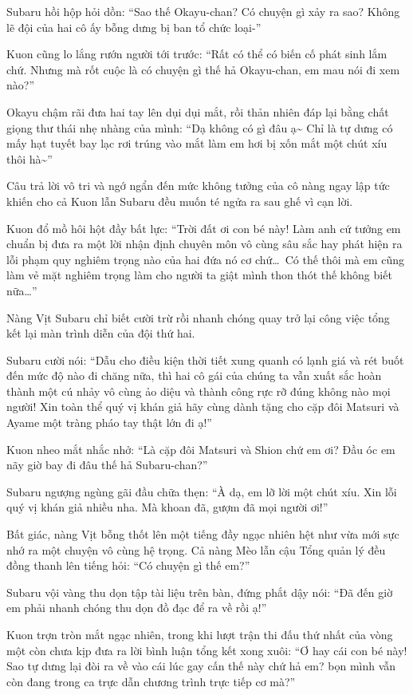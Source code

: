 \documentclass[../main.tex]{subfiles}
\begin{document}
Subaru hồi hộp hỏi dồn: ``Sao thế Okayu-chan? Có chuyện gì xảy ra sao? Không lẽ đội của hai cô ấy bỗng dưng bị ban tổ chức loại-''

Kuon cũng lo lắng rướn người tới trước: ``Rất có thể có biến cố phát sinh lắm chứ. Nhưng mà rốt cuộc là có chuyện gì thế hả Okayu-chan, em mau nói đi xem nào?''

Okayu chậm rãi đưa hai tay lên dụi dụi mắt, rồi thản nhiên đáp lại bằng chất giọng thư thái nhẹ nhàng của mình: ``Dạ không có gì đâu ạ\~{} Chỉ là tự dưng có mấy hạt tuyết bay lạc rơi trúng vào mắt làm em hơi bị xốn mắt một chút xíu thôi hà\~{}''

Câu trả lời vô tri và ngớ ngẩn đến mức không tưởng của cô nàng ngay lập tức khiến cho cả Kuon lẫn Subaru đều muốn té ngửa ra sau ghế vì cạn lời.

Kuon đổ mồ hôi hột đầy bất lực: ``Trời đất ơi con bé này! Làm anh cứ tưởng em chuẩn bị đưa ra một lời nhận định chuyên môn vô cùng sâu sắc hay phát hiện ra lỗi phạm quy nghiêm trọng nào của hai đứa nó cơ chứ\dots\ Có thế thôi mà em cũng làm vẻ mặt nghiêm trọng làm cho người ta giật mình thon thót thế không biết nữa\dots''

Nàng Vịt Subaru chỉ biết cười trừ rồi nhanh chóng quay trở lại công việc tổng kết lại màn trình diễn của đội thứ hai.

Subaru cười nói: ``Dẫu cho điều kiện thời tiết xung quanh có lạnh giá và rét buốt đến mức độ nào đi chăng nữa, thì hai cô gái của chúng ta vẫn xuất sắc hoàn thành một cú nhảy vô cùng ảo diệu và thành công rực rỡ đúng không nào mọi người! Xin toàn thể quý vị khán giả hãy cùng dành tặng cho cặp đôi Matsuri và Ayame một tràng pháo tay thật lớn đi ạ!''

Kuon nheo mắt nhắc nhở: ``Là cặp đôi Matsuri và Shion chứ em ơi? Đầu óc em nãy giờ bay đi đâu thế hả Subaru-chan?''

Subaru ngượng ngùng gãi đầu chữa thẹn: ``À dạ, em lỡ lời một chút xíu. Xin lỗi quý vị khán giả nhiều nha. Mà khoan đã, gượm đã mọi người ơi!''

Bất giác, nàng Vịt bỗng thốt lên một tiếng đầy ngạc nhiên hệt như vừa mới sực nhớ ra một chuyện vô cùng hệ trọng. Cả nàng Mèo lẫn cậu Tổng quản lý đều đồng thanh lên tiếng hỏi: ``Có chuyện gì thế em?''

Subaru vội vàng thu dọn tập tài liệu trên bàn, đứng phắt dậy nói: ``Đã đến giờ em phải nhanh chóng thu dọn đồ đạc để ra về rồi ạ!''

Kuon trợn tròn mắt ngạc nhiên, trong khi lượt trận thi đấu thứ nhất của vòng một còn chưa kịp đưa ra lời bình luận tổng kết xong xuôi: ``Ơ hay cái con bé này! Sao tự dưng lại đòi ra về vào cái lúc gay cấn thế này chứ hả em? bọn mình vẫn còn đang trong ca trực dẫn chương trình trực tiếp cơ mà?''
\end{document}
